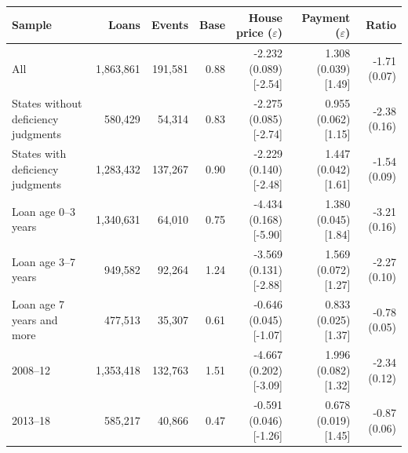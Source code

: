 \begin{tabular}{lrrrrrr}
\toprule
Sample & Loans & Events & Base & House price ($\varepsilon$) & Payment ($\varepsilon$) & Ratio \\
\midrule
All & 1,863,861 & 191,581 & 0.88 & -2.232 (0.089) [-2.54] & 1.308 (0.039) [1.49] & -1.71 (0.07) \\
States without deficiency judgments & 580,429 & 54,314 & 0.83 & -2.275 (0.085) [-2.74] & 0.955 (0.062) [1.15] & -2.38 (0.16) \\
States with deficiency judgments & 1,283,432 & 137,267 & 0.90 & -2.229 (0.140) [-2.48] & 1.447 (0.042) [1.61] & -1.54 (0.09) \\
Loan age 0--3 years & 1,340,631 & 64,010 & 0.75 & -4.434 (0.168) [-5.90] & 1.380 (0.045) [1.84] & -3.21 (0.16) \\
Loan age 3--7 years & 949,582 & 92,264 & 1.24 & -3.569 (0.131) [-2.88] & 1.569 (0.072) [1.27] & -2.27 (0.10) \\
Loan age 7 years and more & 477,513 & 35,307 & 0.61 & -0.646 (0.045) [-1.07] & 0.833 (0.025) [1.37] & -0.78 (0.05) \\
2008--12 & 1,353,418 & 132,763 & 1.51 & -4.667 (0.202) [-3.09] & 1.996 (0.082) [1.32] & -2.34 (0.12) \\
2013--18 & 585,217 & 40,866 & 0.47 & -0.591 (0.046) [-1.26] & 0.678 (0.019) [1.45] & -0.87 (0.06) \\
\bottomrule
\end{tabular}
